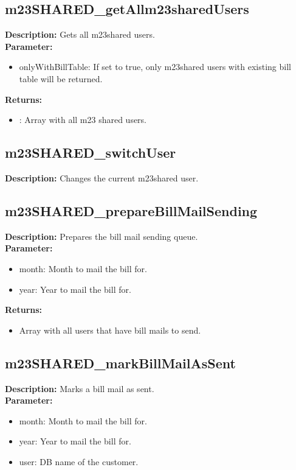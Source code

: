 \subsection{m23SHARED\_getAllm23sharedUsers}
\textbf{Description:} Gets all m23shared users.\\
\textbf{Parameter:}
\begin{itemize}
\item onlyWithBillTable: If set to true, only m23shared users with existing bill table will be returned.
\end{itemize}
\textbf{Returns:}
\begin{itemize}
\item : Array with all m23 shared users.
\end{itemize}

\subsection{m23SHARED\_switchUser}
\textbf{Description:} Changes the current m23shared user.\\

\subsection{m23SHARED\_prepareBillMailSending}
\textbf{Description:} Prepares the bill mail sending queue.\\
\textbf{Parameter:}
\begin{itemize}
\item month: Month to mail the bill for.
\item year: Year to mail the bill for.
\end{itemize}
\textbf{Returns:}
\begin{itemize}
\item Array with all users that have bill mails to send.
\end{itemize}

\subsection{m23SHARED\_markBillMailAsSent}
\textbf{Description:} Marks a bill mail as sent.\\
\textbf{Parameter:}
\begin{itemize}
\item month: Month to mail the bill for.
\item year: Year to mail the bill for.
\item user: DB name of the customer.
\end{itemize}

